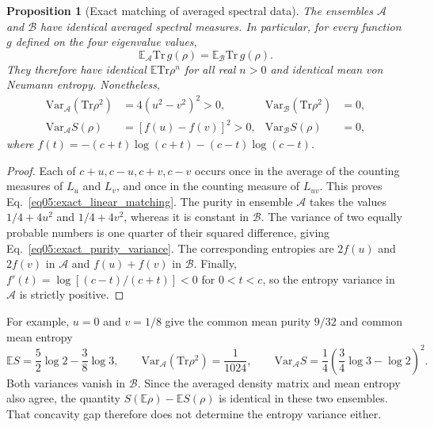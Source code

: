 \documentclass[11pt,letterpaper]{article}
\theoremstyle{plain}
\newtheorem{proposition}[theorem]{Proposition}
\theoremstyle{definition}
\theoremstyle{remark}
\begin{document}
\begin{proposition}[Exact matching of averaged spectral data]
\label{prop05:exact_spectral_separation}
The ensembles $\mathcal A$ and $\mathcal B$ have identical averaged
spectral measures.  In particular, for every function $g$ defined on
the four eigenvalue values,
\begin{equation}
\label{eq05:exact_linear_matching}
 \mathbb E_{\mathcal A}\mathrm{Tr}\,g(\rho)
 =\mathbb E_{\mathcal B}\mathrm{Tr}\,g(\rho).
\end{equation}
They therefore have identical $\mathbb E\mathrm{Tr}\rho^n$ for all
real $n>0$ and identical mean von Neumann entropy.  Nonetheless,
\begin{align}
\label{eq05:exact_purity_variance}
 \mathrm{Var}_{\mathcal A}(\mathrm{Tr}\rho^2)
 &=4(u^2-v^2)^2>0,
 &\mathrm{Var}_{\mathcal B}(\mathrm{Tr}\rho^2)&=0,\\
\label{eq05:exact_entropy_variance}
 \mathrm{Var}_{\mathcal A}S(\rho)
 &=[f(u)-f(v)]^2>0,
 &\mathrm{Var}_{\mathcal B}S(\rho)&=0,
\end{align}
where $f(t)=-(c+t)\log(c+t)-(c-t)\log(c-t)$.
\end{proposition}

\begin{proof}
Each of $c+u,c-u,c+v,c-v$ occurs once in the average of the counting
measures of $L_u$ and $L_v$, and once in the counting measure of
$L_{uv}$.  This proves Eq.~\eqref{eq05:exact_linear_matching}.
The purity in ensemble $\mathcal A$ takes the values $1/4+4u^2$
and $1/4+4v^2$, whereas it is constant in $\mathcal B$.
The variance of two equally probable numbers is one quarter of their
squared difference, giving Eq.~\eqref{eq05:exact_purity_variance}.
The corresponding entropies are $2f(u)$ and $2f(v)$ in $\mathcal A$
and $f(u)+f(v)$ in $\mathcal B$.  Finally,
$f'(t)=\log[(c-t)/(c+t)]<0$ for $0<t<c$, so the entropy variance
in $\mathcal A$ is strictly positive.
\end{proof}

For example, $u=0$ and $v=1/8$ give the common mean purity $9/32$
and common mean entropy
\begin{equation}
\label{eq05:exact_example_values}
 \mathbb E S=\frac52\log2-\frac38\log3,
 \qquad
 \mathrm{Var}_{\mathcal A}(\mathrm{Tr}\rho^2)=\frac1{1024},
 \qquad
 \mathrm{Var}_{\mathcal A}S
 =\frac14\left(\frac34\log3-\log2\right)^2.
\end{equation}
Both variances vanish in $\mathcal B$.  Since the averaged density
matrix and mean entropy also agree, the quantity
$S(\mathbb E\rho)-\mathbb E S(\rho)$ is identical in these two
ensembles.  That concavity gap therefore does not determine the
entropy variance either.
\end{document}
